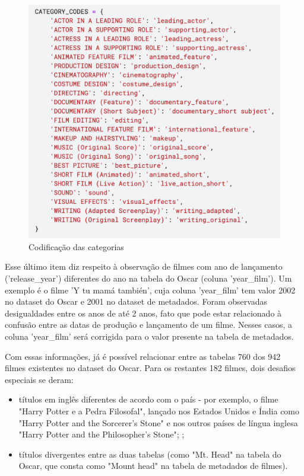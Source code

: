             \begin{figure}[htb]
            	\caption{\label{cat_cods}Codificação das categorias}
            	\begin{center}
            		\includegraphics[scale=0.7]{categ_codes.png}
            	\end{center}
            \end{figure}

            Esse último item diz respeito à observação de filmes com ano de lançamento ('release\_year') diferentes do ano na tabela do Oscar (coluna 'year\_film'). Um exemplo é o filme 'Y tu mamá también', cuja coluna 'year\_film' tem valor 2002 no dataset do Oscar e 2001 no dataset de metadados. Foram observadas desigualdades entre os anos de até 2 anos, fato que pode estar relacionado à confusão entre as datas de produção e lançamento de um filme. Nesses casos, a coluna 'year\_film' será corrigida para o valor presente na tabela de metadados.


            Com essas informações, já é possível relacionar entre as tabelas 760 dos 942 filmes existentes no dataset do Oscar. Para os restantes 182 filmes, dois desafios especiais se deram:\par

            \begin{itemize}
                \item títulos em inglês diferentes de acordo com o país - por exemplo, o filme "Harry Potter e a Pedra Filosofal", lançado nos Estados Unidos e Índia como "Harry Potter and the Sorcerer's Stone" e nos outros países de língua inglesa "Harry Potter and the Philosopher's Stone"; \cite{yahoo2000};\par
                \item títulos divergentes entre as duas tabelas (como "Mt. Head" na tabela do Oscar, que consta como "Mount head" na tabela de metadados de filmes).\par
            \end{itemize}

